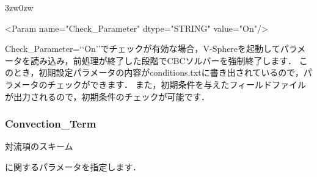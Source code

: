 \begin{indentation}{3zw}{0zw}

{\small
\begin{program}
<Param name="Check_Parameter" dtype="STRING" value="On"/>
\end{program}
}

Check\_Parameter=\lq\lq On\rq\rq でチェックが有効な場合，V-Sphereを起動してパラメータを読み込み，前処理が終了した段階でCBCソルバーを強制終了します．
このとき，初期設定パラメータの内容がconditions.txtに書き出されているので，パラメータのチェックができます．
また，初期条件を与えたフィールドファイルが出力されるので，初期条件のチェックが可能です．

\end{indentation}



\pagebreak
\subsubsection{Convection\_Term}

\hypertarget{tgt:convection_term}{対流項のスキーム}に関するパラメータを指定します．

